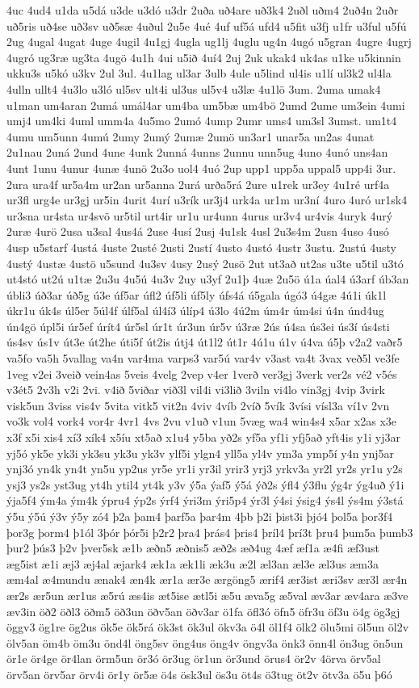 {4uc
4ud4
u1da
u5dá
u3de
u3dó
u3dr
2uða
uð4are
uð3k4
2uðl
uðm4
2uð4n
2uðr
uð5ris
uð4se
uð3sv
uð5sæ
4uðul
2u5e
4ué
4uf
uf5á
ufd4
u5fit
u3fj
u1fr
u3ful
u5fú
2ug
4ugal
4ugat
4uge
4ugil
4u1gj
4ugla
ug1lj
4uglu
ug4n
4ugó
u5gran
4ugre
4ugrj
4ugró
ug3ræ
ug3ta
4ugö
4u1h
4ui
u5ið
4uí4
2uj
2uk
ukak4
uk4as
u1ke
u5kinnin
ukku3s
u5kó
u3kv
2ul
3ul.
4u1lag
ul3ar
3ulb
4ule
u5lind
ul4is
u1lí
ul3k2
ul4la
4ulln
ullt4
4u3lo
u3ló
ul5sv
ult4i
ul3us
ul5v4
u3læ
4u1lö
3um.
2uma
umak4
u1man
um4aran
2umá
umál4ar
um4ba
um5bæ
um4bö
2umd
2ume
um3ein
4umi
umj4
um4ki
4uml
umm4a
4u5mo
2umó
4ump
2umr
ums4
um3sl
3umst.
um1t4
4umu
um5unn
4umú
2umy
2umý
2umæ
2umö
un3ar1
unar5a
un2as
4unat
2u1nau
2uná
2und
4une
4unk
2unná
4unns
2unnu
unn5ug
4uno
4unó
uns4an
4unt
1unu
4unur
4unæ
4unö
2u3o
uol4
4uó
2up
upp1
upp5a
uppal5
upp4i
3ur.
2ura
ura4f
ur5a4m
ur2an
ur5anna
2urá
urða5rá
2ure
u1rek
ur3ey
4u1ré
urf4a
ur3fl
urg4e
ur3gj
ur5in
4urit
4urí
u3rík
ur3j4
urk4a
ur1m
ur3ní
4uro
4uró
ur1sk4
ur3sna
ur4sta
ur4svö
ur5til
urt4ir
ur1u
ur4unn
4urus
ur3v4
ur4vis
4uryk
4urý
2uræ
4urö
2usa
u3sal
4us4á
2use
4usí
2usj
4u1sk
4usl
2u3s4m
2usn
4uso
4usó
4usp
u5starf
4ustá
4uste
2usté
2usti
2ustí
4usto
4ustó
4ustr
3ustu.
2ustú
4usty
4ustý
4ustæ
4ustö
u5sund
4u3sv
4usy
2usý
2usö
2ut
ut3að
ut2as
u3te
u5til
u3tó
ut4stó
ut2ú
u1tæ
2u3u
4u5ú
4u3v
2uy
u3yf
2u1þ
4uæ
2u5ö
ú1a
úal4
ú3arf
úb3an
úbli3
úð3ar
úð5g
ú3e
úf5ar
úfl2
úf5li
úf5ly
úfs4á
ú5gala
úgó3
ú4gæ
4ú1i
úk1l
úkr1u
úk4s
úl5er
5úl4f
úlf5al
úl4í3
úlíp4
ú3lo
4ú2m
úm4r
úm4si
ú4n
únd4ug
ún4gö
úpl5i
úr5ef
úrít4
úr5sl
úr1t
úr3un
úr5v
ú3ræ
2ús
ú4sa
ús3ei
ús3í
ús4sti
ús4sv
ús1v
út3e
út2he
úti5f
út2is
útj4
út1l2
út1r
4ú1u
ú1v
ú4va
ú5þ
v2a2
vaðr5
va5fo
va5h
5vallag
va4n
var4ma
varps3
var5ú
var4v
v3ast
va4t
3vax
veð5l
ve3fe
1veg
v2ei
3veið
vein4as
5veis
4velg
2vep
v4er
1verð
ver3gj
3verk
ver2s
vé2
v5és
v3ét5
2v3h
v2i
2vi.
v4ið
5viðar
við3l
vil4i
vi3lið
3viln
vi4lo
vin3gj
4vip
3virk
visk5un
3viss
vis4v
5vita
vitk5
vit2n
4viv
4víb
2víð
5vík
3vísi
vísl3a
ví1v
2vn
vo3k
vol4
vork4
vor4r
4vr1
4vs
2vu
v1uð
v1un
5væg
wa4
win4s4
x5ar
x2as
x3e
x3f
x5i
xis4
xí3
xík4
x5íu
xt5að
x1u4
y5ba
yð2s
yf5a
yf1i
yfj5að
yft4is
y1i
yj3ar
yj5ó
yk5e
yk3i
yk3su
yk3u
yk3v
ylf5i
ylgn4
yll5a
yl4v
ym3a
ymp5í
y4n
ynj5ar
ynj3ó
yn4k
yn4t
yn5u
yp2us
yr5e
yr1i
yr3il
yrir3
yrj3
yrkv3a
yr2l
yr2s
yr1u
y2s
ysj3
ys2s
yst3ug
yt4h
ytil4
yt4k
y3v
ý5a
ýaf5
ý5á
ýð2s
ýfl4
ý3flu
ýg4r
ýg4uð
ý1i
ýja5f4
ým4a
ým4k
ýpru4
ýp2s
ýrf4
ýri3m
ýri5p4
ýr3l
ý4si
ýsig4
ýs4l
ýs4m
ý3stá
ý5u
ý5ú
ý3v
ý5y
zó4
þ2a
þam4
þarf5a
þar4m
4þb
þ2i
þist3i
þjó4
þol5a
þor3f4
þor3g
þorm4
þ1ól
3þór
þór5i
þ2r2
þra4
þrás4
þris4
þríl4
þrí3t
þru4
þum5a
þumb3
þur2
þús3
þ2v
þver5sk
æ1b
æðn5
æðnis5
æð2s
æð4ug
4æf
æf1a
æ4fi
æf3ust
æg5ist
æ1i
æj3
æj4al
æjark4
æk1a
æk1li
æk3u
æ2l
æl3an
æl3e
æl3us
æm3a
æm4al
æ4mundu
ænak4
æn4k
ær1a
ær3e
ærgöng5
ærif4
ær3ist
æri3sv
ær3l
ær4n
ær2s
ær5un
ær1us
æ5rú
æs4is
æt5ise
ætl5i
æ5u
æva5g
æ5val
æv3ar
æv4ara
æ3ve
æv3in
öð2
öðl3
öðm5
öð3un
öðv5an
öðv3ar
ö1fa
öfl3ó
öfn5
öfr3u
öf3u
ö4g
ög3gj
öggv3
ög1re
ög2us
ök5e
ök5rá
ök3st
ök3ul
ökv3a
ö4l
öl1f4
ölk2
ölu5mi
öl5un
öl2v
ölv5an
öm4b
öm3u
önd4l
öng5sv
öng4us
öng4v
öngv3a
önk3
önn4l
ön3ug
ön5un
ör1e
ör4ge
ör4lan
örm5un
ör3ó
ör3ug
ör1un
ör3und
örus4
ör2v
4örva
örv5al
örv5an
örv5ar
örv4i
ör1y
ör5æ
ö4s
ösk3ul
ös3u
öt4s
ö3tug
öt2v
ötv3a
ö5u
þ6ó
}
